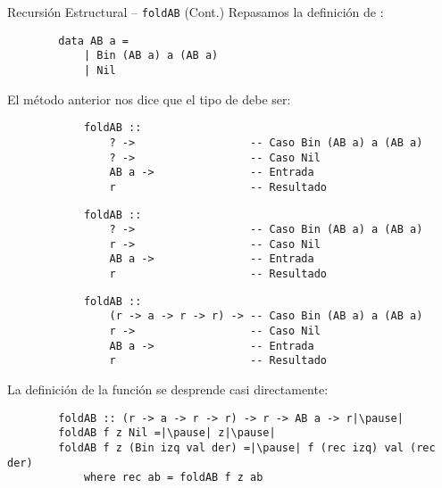 \begin{frame}[fragile]{Recursión Estructural -- \texttt{foldAB} (Cont.)}
    Repasamos la definición de :

    \begin{verbatim}
        data AB a =
            | Bin (AB a) a (AB a)
            | Nil
    \end{verbatim}

    \pause

    El método anterior nos dice que el tipo de  debe ser:

    \begin{overprint}
        \begin{verbatim}
            foldAB ::
                ? ->                  -- Caso Bin (AB a) a (AB a)
                ? ->                  -- Caso Nil
                AB a ->               -- Entrada
                r                     -- Resultado
        \end{verbatim}
        
        \pause

        \begin{verbatim}
            foldAB ::
                ? ->                  -- Caso Bin (AB a) a (AB a)
                r ->                  -- Caso Nil
                AB a ->               -- Entrada
                r                     -- Resultado
        \end{verbatim}

        \pause

        \begin{verbatim}
            foldAB ::
                (r -> a -> r -> r) -> -- Caso Bin (AB a) a (AB a)
                r ->                  -- Caso Nil
                AB a ->               -- Entrada
                r                     -- Resultado
        \end{verbatim}

    \end{overprint}

    \pause

    La definición de la función se desprende casi directamente:
    \begin{verbatim}
        foldAB :: (r -> a -> r -> r) -> r -> AB a -> r|\pause|
        foldAB f z Nil =|\pause| z|\pause|
        foldAB f z (Bin izq val der) =|\pause| f (rec izq) val (rec der)
            where rec ab = foldAB f z ab
    \end{verbatim}
\end{frame}

